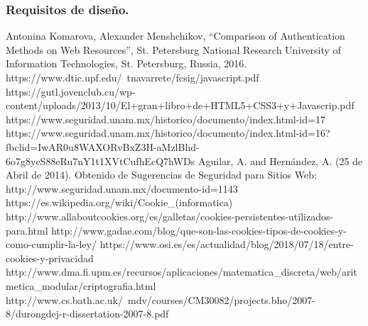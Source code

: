 \documentclass[12pt, a4paper, titlepage]{article}
\begin{document}
			\subsubsection{Requisitos de diseño.}
	\begin{thebibliography}{20}
	     Antonina Komarova, Alexander Menshchikov, “Comparison of Authentication Methods on Web Resources”, St. Petersburg National Research University of Information Technologies, St. Petersburg, Russia, 2016.
		 https://www.dtic.upf.edu/~tnavarrete/fcsig/javascript.pdf 
		 https://gutl.jovenclub.cu/wp-content/uploads/2013/10/El+gran+libro+de+HTML5+CSS3+y+Javascrip.pdf
		 https://www.seguridad.unam.mx/historico/documento/index.html-id=17
		https://www.seguridad.unam.mx/historico/documento/index.html-id=16?fbclid=IwAR0u8WAXORvBxZ3H-aMzlBhd-6o7g8ycS88eRu7nY1t1XVtCufhEcQ7hWDs
		 Aguilar, A. and Hernández, A. (25 de Abril de 2014). Obtenido de Sugerencias de Seguridad para Sitios Web: http://www.seguridad.unam.mx/documento-id=1143
		https://es.wikipedia.org/wiki/Cookie\_(informatica)
		http://www.allaboutcookies.org/es/galletas/cookies-persistentes-utilizados-para.html
		http://www.gadae.com/blog/que-son-las-cookies-tipos-de-cookies-y-como-cumplir-la-ley/
		https://www.osi.es/es/actualidad/blog/2018/07/18/entre-cookies-y-privacidad
		http://www.dma.fi.upm.es/recursos/aplicaciones/matematica\_discreta/web/aritmetica\_modular/criptografia.html
		http://www.cs.bath.ac.uk/~mdv/courses/CM30082/projects.bho/2007-8/durongdej-r-dissertation-2007-8.pdf
	\end{thebibliography}		
\end{document}
